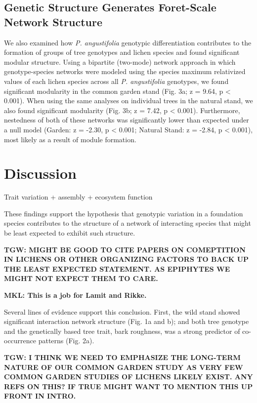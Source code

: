 \documentclass[fleqn,10pt]{wlscirep}
\begin{document}
\subsection*{Genetic Structure Generates Foret-Scale Network Structure}

We also examined how \textit{P. angustifolia} genotypic
differentiation contributes to the formation of groups of tree
genotypes and lichen species and found significant modular
structure. Using a bipartite (two-mode) network approach in which
genotype-species networks were modeled using the species maximum
relativized values of each lichen species across all
\textit{P. angustifolia} genotypes, we found significant modularity in
the common garden stand (Fig. 3a; z = 9.64, p < 0.001). When using the
same analyses on individual trees in the natural stand, we also found
significant modularity (Fig. 3b; z = 7.42, p < 0.001). Furthermore,
nestedness of both of these networks was significantly lower than
expected under a null model (Garden: z = -2.30, p < 0.001; Natural
Stand: z = -2.84, p < 0.001), most likely as a result of module
formation.


\section*{Discussion}


Trait variation + assembly + ecosystem function

These findings support the hypothesis that genotypic variation in a
foundation species contributes to the structure of a network of
interacting species that might be least expected to exhibit such
structure. 

\textbf{TGW: MIGHT BE GOOD TO CITE PAPERS ON COMEPTITION IN LICHENS OR
OTHER ORGANIZING FACTORS TO BACK UP THE LEAST EXPECTED STATEMENT.  AS
EPIPHYTES WE MIGHT NOT EXPECT THEM TO CARE.}

\textbf{MKL: This is a job for Lamit and Rikke.}

Several lines of evidence support this conclusion. First, the wild
stand showed significant interaction network structure (Fig. 1a and
b); and both tree genotype and the genetically based tree trait, bark
roughness, was a strong predictor of co-occurrence patterns
(Fig. 2a). 

\textbf{TGW: I THINK WE NEED TO EMPHASIZE THE LONG-TERM NATURE OF OUR
COMMON GARDEN STUDY AS VERY FEW COMMON GARDEN STUDIES OF LICHENS
LIKELY EXIST. ANY REFS ON THIS? IF TRUE MIGHT WANT TO MENTION THIS UP
FRONT IN INTRO.}
\end{document}
